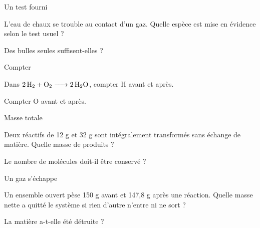 \par\noindent\begin{minipage}{\linewidth}
\begin{exercice}[1]{Un test fourni}
\begin{questions}
\item L’eau de chaux se trouble au contact d’un gaz. Quelle espèce est mise en évidence selon le test usuel ?
\item Des bulles seules suffisent-elles ?
\end{questions}
\end{exercice}
\end{minipage}
\par\noindent\begin{minipage}{\linewidth}
\begin{exercice}[1]{Compter}
\begin{questions}
\item Dans $\ce{2 H2 + O2 -> 2 H2O}$, compter H avant et après.
\item Compter O avant et après.
\end{questions}
\end{exercice}
\end{minipage}
\par\noindent\begin{minipage}{\linewidth}
\begin{exercice}[1]{Masse totale}
\begin{questions}
\item Deux réactifs de 12 g et 32 g sont intégralement transformés sans échange de matière. Quelle masse de produits ?
\item Le nombre de molécules doit-il être conservé ?
\end{questions}
\end{exercice}
\end{minipage}
\clearpage{}
\par\noindent\begin{minipage}{\linewidth}
\begin{exercice}[2]{Un gaz s’échappe}
\begin{questions}
\item Un ensemble ouvert pèse 150 g avant et 147,8 g après une réaction. Quelle masse nette a quitté le système si rien d’autre n’entre ni ne sort ?
\item La matière a-t-elle été détruite ?
\end{questions}
\end{exercice}
\end{minipage}
